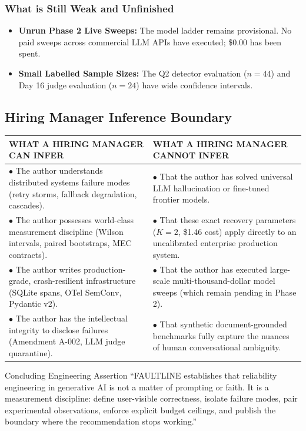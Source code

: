 \subsubsection{What is Still Weak and Unfinished}
\begin{itemize}
\setlength{\itemsep}{1pt}\setlength{\parskip}{0pt}
    \item \textbf{Unrun Phase 2 Live Sweeps:} The model ladder remains provisional. No paid sweeps across commercial LLM APIs have executed; \$0.00 has been spent.
    \item \textbf{Small Labelled Sample Sizes:} The Q2 detector evaluation ($n=44$) and Day 16 judge evaluation ($n=24$) have wide confidence intervals.
\end{itemize}

\subsection{Hiring Manager Inference Boundary}
\begin{center}
\small
\begin{tabularx}{\textwidth}{>{\raggedright\arraybackslash}X|>{\raggedright\arraybackslash}X}
\toprule
\textbf{\color{primary}WHAT A HIRING MANAGER CAN INFER} & \textbf{\color{accent}WHAT A HIRING MANAGER CANNOT INFER} \\
\midrule
$\bullet$ The author understands distributed systems failure modes (retry storms, fallback degradation, cascades). & $\bullet$ That the author has solved universal LLM hallucination or fine-tuned frontier models. \\
\addlinespace
$\bullet$ The author possesses world-class measurement discipline (Wilson intervals, paired bootstraps, MEC contracts). & $\bullet$ That these exact recovery parameters ($K=2$, \$1.46 cost) apply directly to an uncalibrated enterprise production system. \\
\addlinespace
$\bullet$ The author writes production-grade, crash-resilient infrastructure (SQLite spans, OTel SemConv, Pydantic v2). & $\bullet$ That the author has executed large-scale multi-thousand-dollar model sweeps (which remain pending in Phase 2). \\
\addlinespace
$\bullet$ The author has the intellectual integrity to disclose failures (Amendment A-002, LLM judge quarantine). & $\bullet$ That synthetic document-grounded benchmarks fully capture the nuances of human conversational ambiguity. \\
\bottomrule
\end{tabularx}
\end{center}

\vspace{0.8cm}
\begin{callout}[primary]{Concluding Engineering Assertion}
``FAULTLINE establishes that reliability engineering in generative AI is not a matter of prompting or faith. It is a measurement discipline: define user-visible correctness, isolate failure modes, pair experimental observations, enforce explicit budget ceilings, and publish the boundary where the recommendation stops working.''
\end{callout}
